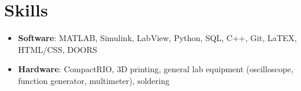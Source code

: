 \documentclass[12pt]{article}
\begin{document}
\section*{Skills}
\vspace*{-1em}\makebox[\linewidth]{\rule{\textwidth}{0.4pt}}
\begin{itemize}
\item \textbf{Software}: MATLAB, Simulink, LabView, Python, SQL, C++, Git, LaTEX, HTML/CSS, DOORS
\item \textbf{Hardware}: CompactRIO, 3D printing, general lab equipment (oscilloscope, function generator, multimeter), soldering
\end{itemize}
\end{document}
